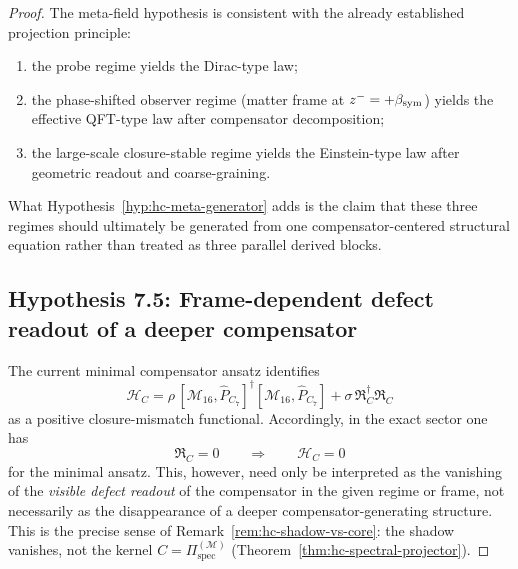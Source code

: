 \begin{proof}
The meta-field hypothesis is consistent with the already established
projection principle:
\begin{enumerate}[label=(\arabic*)]
  \item the probe regime yields the Dirac-type law;
  \item the phase-shifted observer regime (matter frame at
        $z^- = +\beta_{\mathrm{sym}}$) yields the effective QFT-type law after
        compensator decomposition;
  \item the large-scale closure-stable regime yields the Einstein-type
        law after geometric readout and coarse-graining.
\end{enumerate}
What Hypothesis~\ref{hyp:hc-meta-generator} adds is the claim that
these three regimes should ultimately be generated from one
compensator-centered structural equation rather than treated as three
parallel derived blocks.


\subsection{Hypothesis 7.5: Frame-dependent defect readout of a deeper compensator}
\label{subsec:hc-frame-dependent-readout}

The current minimal compensator ansatz identifies
\[
  \mathcal{H}_C
  =
  \rho\,[\mathcal{M}_{16},\hat P_{C_7}]^\dagger
        [\mathcal{M}_{16},\hat P_{C_7}]
  +
  \sigma\,\mathfrak{R}_C^\dagger\mathfrak{R}_C
\]
as a positive closure-mismatch functional. Accordingly, in the exact
sector one has
\[
  \mathfrak{R}_C = 0
  \qquad\Longrightarrow\qquad
  \mathcal{H}_C = 0
\]
for the minimal ansatz. This, however, need only be interpreted as the
vanishing of the \emph{visible defect readout} of the compensator in the
given regime or frame, not necessarily as the disappearance of a deeper
compensator-generating structure. This is the precise sense of
Remark~\ref{rem:hc-shadow-vs-core}: the shadow vanishes, not the kernel
$C = \Pi^{(\mathcal{M})}_{\mathrm{spec}}$
(Theorem~\ref{thm:hc-spectral-projector}).


\end{proof}
